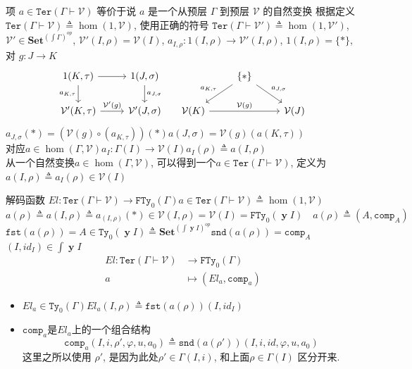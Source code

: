 \documentclass[aspectratio=169,xcolor=dvipsnames]{beamer}
\newcommand\calV{\mathcal{V}}
\newcommand\FTy{\mathtt{FTy}}
\newcommand\comp{\mathtt{comp}}
\newcommand\fst{\mathtt{fst}}
\newcommand\snd{\mathtt{snd}}
\newcommand\Ty{\mathtt{Ty}}
\newcommand\Ter{\mathtt{Ter}}
\newcommand\Set{\mathbf{Set}}
\DeclareMathOperator\y{\mathbf{y}}
\begin{document}
\begin{frame}{项 $a ∈ \Ter(Γ ⊢ \calV)$ 等价于说 $a$ 是一个从预层 $Γ$ 到预层 $\calV$ 的自然变换}
  根据定义 $\Ter(\Gamma\vdash \calV)\triangleq\hom(1,\calV)$, 使用正确的符号 $\Ter(\Gamma\vdash \calV')\triangleq\hom(1,\calV')$, $\calV'\in\Set^{(\int\Gamma)^{op}}$, $\calV'(I,\rho)=\calV(I)$, $a_{I,\rho}:1(I,\rho)\to\calV'(I,\rho)$, $1(I,\rho)=\{\ast\}$, 对 $g:J\to K$
  \[
  \begin{tabular}{cc}
  \begin{tikzcd}
  1(K,\tau) \arrow[d,"{a_{K,\tau}}"'] \arrow[r] & 1(J,\sigma) \arrow[d,"{a_{J,\sigma}}"]\\
  \calV'(K,\tau) \arrow[r,"{\calV'(g)}"] & \calV'(J,\sigma)
  \end{tikzcd}
&
  \begin{tikzcd}
    & \{\ast\} \arrow[dl,"{a_{K,\tau}}"'] \arrow[dr,"{a_{J,\sigma}}"] & \\
    \calV(K) \arrow[rr,"{\calV(g)}"] & & \calV(J)
  \end{tikzcd}
\end{tabular} \]
  $a_{J,\sigma}(\ast) = (\calV(g)\circ(a_{K,\tau}))(\ast)$\quad$a(J,\sigma)=\calV(g)(a(K,\tau))$\\
  对应$a\in\hom(\Gamma,\calV)$\quad$a_I:\Gamma(I)\to\calV(I)$\quad$a_I(\rho)\triangleq a(I,\rho)$\\
  从一个自然变换$a\in\hom(\Gamma,\calV)$, 可以得到一个$a\in\Ter(\Gamma\vdash\calV)$, 定义为$a(I,\rho)\triangleq a_I(\rho)\in\calV(I)$
\end{frame}


\begin{frame}[shrink]{解码函数}
    $El : \Ter(\Gamma\vdash\calV)\to\FTy_{0}(\Gamma)$\quad $a\in\Ter(\Gamma\vdash\calV)\triangleq\hom(1,\calV)$\quad $a(\rho)\triangleq a(I,\rho)\triangleq a_{(I,\rho)}(\ast)\in\calV(I,\rho)=\calV(I)=\FTy_{0}(\y I)\quad a(\rho)\triangleq(A,\comp_{A})$
  $\fst(a(\rho)) = A \in \Ty_0(\y I)\triangleq\Set^{(\int\y I)^{op}}$\quad $\snd(a(\rho)) = \comp_{A}$\quad $(I,id_I)\in\int\y I$
  \begin{align*}
    El : \Ter(\Gamma\vdash\calV)&\to\FTy_{0}(\Gamma) \\
    a &\mapsto (El_a,\comp_a)
  \end{align*}
  \begin{itemize}
    \item $El_a\in\Ty_{0}(\Gamma)$\quad $El_a(I,\rho)\triangleq\fst(a(\rho))(I,id_I)$
    \item $\comp_a$是$El_a$上的一个组合结构\[\comp_a(I,i,\rho',\varphi,u,a_{0})\triangleq\snd(a(\rho'))(I,i,id,\varphi,u,a_0)\]
    这里之所以使用 $\rho'$, 是因为此处$\rho'\in\Gamma(I,i)$, 和上面$\rho\in\Gamma(I)$ 区分开来.
  \end{itemize}

\end{frame}
\end{document}
